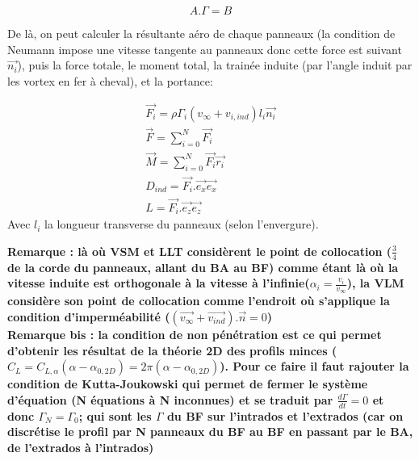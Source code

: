 \begin{equation}
    A.\Gamma = B
    \label{eq : vlm gamma}
\end{equation}

De là, on peut calculer la résultante aéro de chaque panneaux (la condition de Neumann impose une vitesse tangente au panneaux donc cette force est suivant $\overrightarrow{n_i}$), puis la force totale, le moment total, la trainée induite (par l'angle induit par les vortex en fer à cheval), et la portance: 

\begin{equation}
    \begin{split}
        \overrightarrow{F_i} = \rho \Gamma_i(v_{\infty} + v_{i,ind})l_i \overrightarrow{n_i} \\
        \overrightarrow{F} = \sum_{i=0}^{N}\overrightarrow{F_i} \\
        \overrightarrow{M} = \sum_{i=0}^{N}\overrightarrow{F_i} \overrightarrow{r_i} \\
        D_{ind} = \overrightarrow{F_i}.\overrightarrow{e_x} \overrightarrow{e_x} \\
        L = \overrightarrow{F_i}.\overrightarrow{e_z} \overrightarrow{e_z}
    \end{split}
    \label{eq : vlm resultats}
\end{equation}
Avec $l_i$ la longueur transverse du panneaux (selon l'envergure).

\textbf{Remarque : là où VSM et LLT considèrent le point de collocation ($\frac{3}{4}$ de la corde du panneaux, allant du BA au BF) comme étant là où la vitesse induite est orthogonale à la vitesse à l'infinie($\alpha_i = \frac{v_i}{v_{\infty}}$), la VLM considère son point de collocation comme l'endroit où s'applique la condition d'imperméabilité ($(\overrightarrow{v_{\infty}} + \overrightarrow{v_{ind}}).\overrightarrow{n} = 0$)}\\

\textbf{Remarque bis : la condition de non pénétration est ce qui permet d'obtenir les résultat de la théorie 2D des profils minces ($C_L = C_{L, \alpha}(\alpha - \alpha_{0,2D}) = 2\pi (\alpha - \alpha_{0,2D})$). Pour ce faire il faut rajouter la condition de Kutta-Joukowski qui permet de fermer le système d'équation (N équations à N inconnues) et se traduit par $\frac{d\Gamma}{dt} = 0$ et donc $\Gamma_N = \Gamma_0$; qui sont les $\Gamma$ du BF sur l'intrados et l'extrados (car on discrétise le profil par N panneaux du BF au BF en passant par le BA, de l'extrados à l'intrados)}\\

